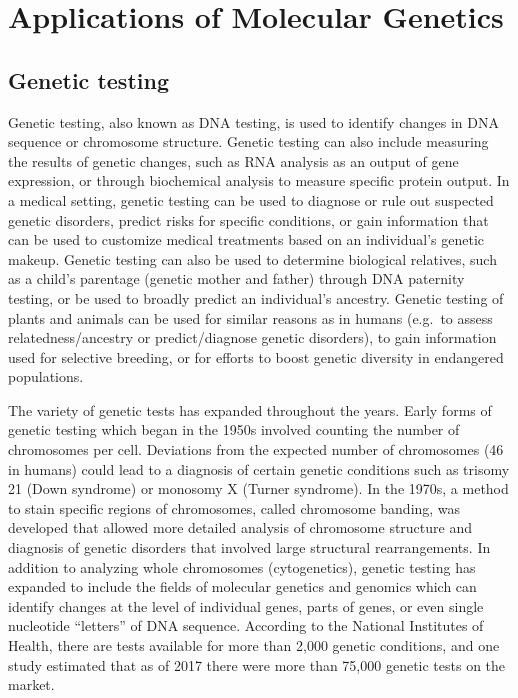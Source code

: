 \hypertarget{applications-of-molecular-genetics}{%
\chapter{Applications of Molecular Genetics}\label{applications-of-molecular-genetics}}

\hypertarget{genetic-testing}{%
\section{Genetic testing}\label{genetic-testing}}

Genetic testing, also known as DNA testing, is used to identify changes in DNA sequence or chromosome structure. Genetic testing can also include measuring the results of genetic changes, such as RNA analysis as an output of gene expression, or through biochemical analysis to measure specific protein output. In a medical setting, genetic testing can be used to diagnose or rule out suspected genetic disorders, predict risks for specific conditions, or gain information that can be used to customize medical treatments based on an individual's genetic makeup. Genetic testing can also be used to determine biological relatives, such as a child's parentage (genetic mother and father) through DNA paternity testing, or be used to broadly predict an individual's ancestry. Genetic testing of plants and animals can be used for similar reasons as in humans (e.g.~to assess relatedness/ancestry or predict/diagnose genetic disorders), to gain information used for selective breeding, or for efforts to boost genetic diversity in endangered populations.

The variety of genetic tests has expanded throughout the years. Early forms of genetic testing which began in the 1950s involved counting the number of chromosomes per cell. Deviations from the expected number of chromosomes (46 in humans) could lead to a diagnosis of certain genetic conditions such as trisomy 21 (Down syndrome) or monosomy X (Turner syndrome). In the 1970s, a method to stain specific regions of chromosomes, called chromosome banding, was developed that allowed more detailed analysis of chromosome structure and diagnosis of genetic disorders that involved large structural rearrangements. In addition to analyzing whole chromosomes (cytogenetics), genetic testing has expanded to include the fields of molecular genetics and genomics which can identify changes at the level of individual genes, parts of genes, or even single nucleotide ``letters'' of DNA sequence. According to the National Institutes of Health, there are tests available for more than 2,000 genetic conditions, and one study estimated that as of 2017 there were more than 75,000 genetic tests on the market.

